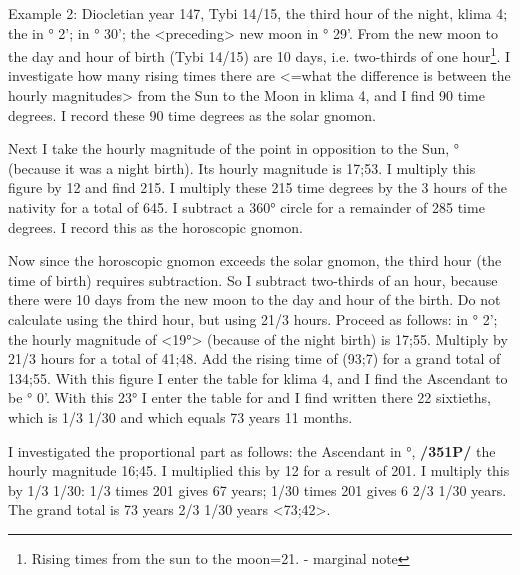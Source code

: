 Example 2: Diocletian year 147, Tybi 14/15, the third hour of the night, klima 4; the \Sun\xspace in \Capricorn\xspace 19° 2'; \Moon\xspace in \Taurus\xspace 23° 30'; the <preceding> new moon in \Capricorn\xspace 9° 29'. From the new moon to the day and hour of birth (Tybi 14/15) are 10 days, i.e. two-thirds of one hour\footnote{Rising times from the sun to the moon=21. - marginal note}. I investigate how many rising times there are <=what the difference is between the hourly magnitudes> from the Sun to the Moon in klima 4, and I find 90 time degrees. I record these 90 time degrees as the solar gnomon. 

Next I take the hourly magnitude of the point in opposition to the Sun, \Cancer\xspace 19° (because it was a night birth). Its hourly magnitude is 17;53. I multiply this figure by 12 and find 215. I multiply these 215 time degrees by the 3 hours of the nativity for a total of 645. I subtract a 360° circle for a remainder of 285 time degrees. I record this as the horoscopic gnomon. 

Now since the horoscopic gnomon exceeds the solar gnomon, the
third hour (the time of birth) requires subtraction. So I subtract two-thirds of an hour, because there were 10 days from the new moon to the day and hour of the birth. Do not calculate using the third hour, but
using 21/3 hours. Proceed as follows: \Sun\xspace in \Capricorn\xspace 19° 2'; the hourly magnitude of \Cancer\xspace <19°> (because of the night birth) is 17;55. Multiply by 21/3 hours for a total of 41;48. Add the rising time of \Cancer\xspace (93;7) for a grand total of 134;55. With this figure I enter the table for klima 4, and I find the Ascendant to be \Leo\xspace 23° 0'. With this 23° I enter the table for \Leo\xspace and I find written there 22 sixtieths, which is 1/3 1/30 and which equals 73 years 11 months. 

I investigated the proportional part as follows: the Ascendant in \Leo\xspace 23°, \textbf{/351P/} the hourly magnitude 16;45. I multiplied this by 12 for a result of 201. I multiply this by 1/3 1/30: 1/3 times 201 gives 67 years; 1/30 times 201 gives 6 2/3 1/30 years. The
grand total is 73 years 2/3 1/30 years <73;42>.

